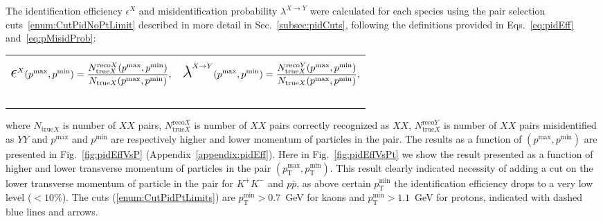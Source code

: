 The identification efficiency $\epsilon^{X}$ and misidentification probability $\lambda^{X\rightarrow Y}$ were calculated for each species using the pair selection cuts~\ref{enum:CutPidNoPtLimit} described in more detail in Sec.~\ref{subsec:pidCuts}, following the definitions provided in Eqs.~\eqref{eq:pidEff} and~\eqref{eq:pMisidProb}:\vspace*{-10pt}

%
\begin{tabulary}{\textwidth}{LL}
\begin{equation}\label{eq:pidEff}
 \mbox{\LARGE$\epsilon$}^{X}(p^{\text{max}}, p^{\text{min}}) = \frac{N^{\text{reco}X}_{\text{true}X}(p^{\text{max}}, p^{\text{min}})}{N_{\text{true}X}(p^{\text{max}}, p^{\text{min}})},
\end{equation}~~~~~~~~~~~~~~~~~~~~~
&
\begin{equation}\label{eq:pMisidProb}
 \mbox{\LARGE$\lambda$}^{X\rightarrow Y}(p^{\text{max}}, p^{\text{min}}) = \frac{N^{\text{reco}Y}_{\text{true}X}(p^{\text{max}}, p^{\text{min}})}{N_{\text{true}X}(p^{\text{max}}, p^{\text{min}})},
\end{equation}~~~~~~~~~~~~~~~~~~~~~
\end{tabulary}
where $N_{\text{true}X}$ is number of $XX$ pairs, $N^{\text{reco}X}_{\text{true}X}$ is number of $XX$ pairs correctly recognized as $XX$, $N^{\text{reco}Y}_{\text{true}X}$ is number of $XX$ pairs misidentified as $YY$ and $p^{\text{max}}$ and $p^{\text{min}}$ are respectively higher and lower momentum of particles in the pair. The results as a function of $(p^{\text{max}}, p^{\text{min}})$ are presented in Fig.~\ref{fig:pidEffVsP} (Appendix~\ref{appendix:pidEff}). Here in Fig.~\ref{fig:pidEffVsPt} we show the result presented as a function of higher and lower transverse momentum of particles in the pair $(p_{\text{T}}^{\text{max}}, p_{\text{T}}^{\text{min}})$. This result clearly indicated necessity of adding a cut on the lower transverse momentum of particle in the pair for $K^{+}K^{-}$ and $p\bar{p}$, as above certain $p_{\text{T}}^{\text{min}}$ the identification efficiency drops to a very low level ($<10\%$). The cuts (\ref{enum:CutPidPtLimits}) are $p_{\text{T}}^{\text{min}}>0.7$~GeV for kaons and $p_{\text{T}}^{\text{min}}>1.1$~GeV for protons, indicated with dashed blue lines and arrows.











